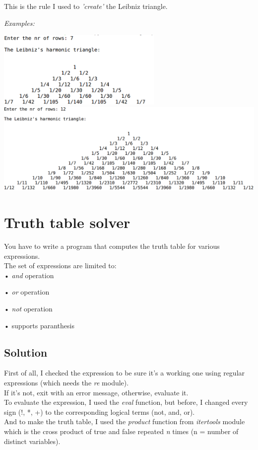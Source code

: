 \documentclass{article}
\begin{document}
    This is the rule I used to \emph{'create'} the Leibniz triangle.

    \vspace{2em}
    \centerline{\emph{Examples:}}
    \vspace{2em}

    \includegraphics[width=8cm]{ex2b.png}\\

    \vspace{2em}
    \includegraphics[width=15cm]{ex2c.png}


  \newpage


    \section{Truth table solver}
      You have to write a program that computes the truth table for various
      expressions.\\
      The set of expressions are limited to:\\

      • \emph{and} operation

      • \emph{or} operation

      • \emph{not} operation

      • supports paranthesis

    \vspace{3em}

    \subsection{Solution}
      First of all, I checked the expression to be sure it's a working one
      using regular expressions (which needs the \emph{re} module).\\
      If it's not, exit with an error message, otherwise, evaluate it.\\
      To evaluate the expression, I used the \emph{eval} function, but before,
      I changed every sign (!, *, +) to the corresponding logical terms (not, and, or).\\
      And to make the truth table, I used the \emph{product} function from
      \emph{itertools} module which is the cross product of true and false repeated
      \emph{n} times (n = number of distinct variables).
\end{document}
